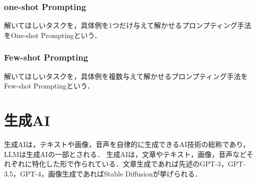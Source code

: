 \subsubsection{one-shot Prompting}
解いてほしいタスクを，具体例を1つだけ与えて解かせるプロンプティング手法をOne-shot Promptingという．

\subsubsection{Few-shot Prompting}
解いてほしいタスクを，具体例を複数与えて解かせるプロンプティング手法をFew-shot Promptingという．

\section{生成AI \label{c4s7}}
生成AIは，テキストや画像，音声を自律的に生成できるAI技術の総称であり，LLMは生成AIの一部とされる．
生成AIは，文章やテキスト，画像，音声などそれぞれに特化した形で作られている．文章生成であれば先述のGPT-3，GPT-3.5，GPT-4，画像生成であればStable Diffusionが挙げられる．



